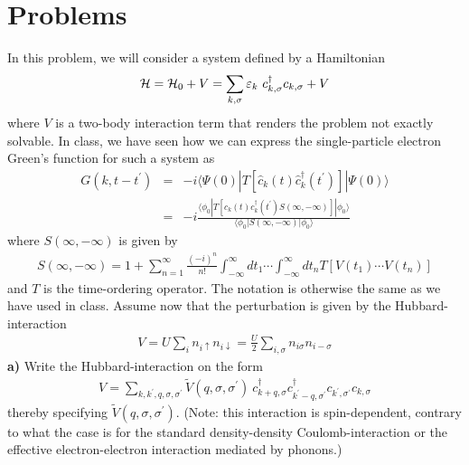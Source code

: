 \section*{Problems}

\begin{problem}
In this problem, we will consider a system defined by a Hamiltonian
\begin{eqnarray}
	\mathcal{H} = \mathcal{H}_0 + V =  \sum_{k,\sigma} \varepsilon_k ~c^{\dagger}_{k,\sigma} c_{k,\sigma} + V \nonumber 
\end{eqnarray}
where $V$ is a two-body interaction term that renders the problem not exactly solvable.  
In class, we have seen how we can express the single-particle electron Green's function for such a system as 
\begin{eqnarray}
	G(k, t-t^{\prime}) & = & -i \langle \Psi(0) | T \left[ \hat c_{k} (t)  \hat c^{\dagger}_{k} (t^{\prime})  \right] | \Psi(0) \rangle \nonumber \\
	& = & -i \frac{ \langle \phi_0 | T \left[ c_{k} (t)  c^{\dagger}_{k} (t^{\prime})S(\infty,-\infty)  \right]| \phi_0 \rangle}{\langle  \phi_0   | S(\infty,-\infty)  |  \phi_0  \rangle } \nonumber
\end{eqnarray} 
where $S(\infty,-\infty)$ is given by
\begin{eqnarray}
	S(\infty,-\infty) = 1 + \sum_{n=1}^{\infty} \frac{(-i)^n}{n!} \int_{-\infty}^{\infty} dt_1 \cdots \int_{-\infty}^{\infty} dt_n T \left[ V(t_1) \cdots  V(t_n) \right] \nonumber 
\end{eqnarray}
and $T$ is the time-ordering operator. The notation is otherwise the same as we have used in class. Assume now that the perturbation is given by the Hubbard-interaction
\begin{eqnarray}
	V = U \sum_i n_{i \uparrow} n_{i \downarrow} =\frac{U}{2} \sum_{i,\sigma} n_{i \sigma} n_{i -\sigma}  \nonumber
\end{eqnarray}
{\bf a)} Write the Hubbard-interaction on the form 
\begin{eqnarray}
	V = \sum_{k,k^{\prime},q,\sigma,\sigma^{\prime}} \tilde V(q,\sigma,\sigma^{\prime}) ~ c^{\dagger}_{k+q,\sigma} c^{\dagger}_{k^{\prime}-q,\sigma^{\prime}}
	c_{k^{\prime},\sigma^{\prime}} c_{k,\sigma} \nonumber 
\end{eqnarray}
thereby specifying $ \tilde V(q,\sigma,\sigma^{\prime}) $. (Note: this interaction is spin-dependent, contrary to what the case is for the standard density-density Coulomb-interaction or the effective electron-electron interaction mediated by phonons.)

\end{problem}
